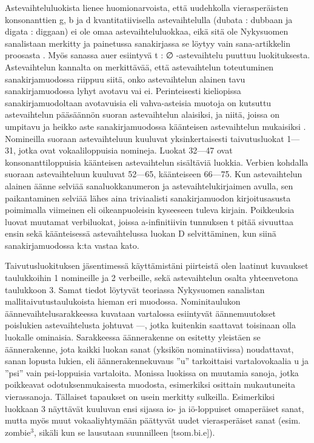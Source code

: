 \documentclass[free]{flammie}
\begin{document}
Astevaihteluluokista lienee huomionarvoista, että uudehkolla vierasperäisten konsonanttien g, b ja d kvantitatiivisella astevaihtelulla (dubata : dubbaan ja digata :
diggaan) ei ole omaa astevaihteluluokkaa, eikä sitä ole Nykysuomen sanalistaan
merkitty ja painetussa sanakirjassa se löytyy vain sana-artikkelin proosasta \cite{eronen1994nykysuomen}. Myös sanassa auer esiintyvä t : ∅ -astevaihtelu puuttuu luokituksesta.
Astevaihtelun kannalta on merkittävää, että astevaihtelun toteutuminen sanakirjamuodossa riippuu siitä, onko astevaihtelun alainen tavu sanakirjamuodossa lyhyt avotavu vai ei. Perinteisesti kieliopissa sanakirjamuodoltaan avotavuisia eli
vahva-asteisia muotoja on kutsuttu astevaihtelun pääsäännön suoran astevaihtelun
alaisiksi, ja niitä, joissa on umpitavu ja heikko aste sanakirjamuodossa käänteisen
astevaihtelun mukaisiksi \cite{hakulinen2008iso}. Nomineilla suoraan astevaihteluun kuuluvat yksinkertaisesti taivutusluokat 1—31, jotka ovat vokaaliloppuisia
nomineja. Luokat 32—47 ovat konsonanttiloppuisia käänteisen astevaihtelun sisältäviä luokkia. Verbien kohdalla suoraan astevaihteluun kuuluvat 52—65, käänteiseen 66—75. Kun astevaihtelun alainen äänne selviää sanaluokkanumeron ja
astevaihtelukirjaimen avulla, sen paikantaminen selviää lähes aina triviaalisti sanakirjamuodon kirjoitusasusta poimimalla viimeinen eli oikeanpuoleisin kyseeseen tuleva kirjain. Poikkeuksia luovat muutamat verbiluokat, joissa a-infinitiivin
tunnuksen t pitää sivuuttaa ensin sekä käänteisessä astevaihtelussa luokan D selvittäminen, kun siinä sanakirjamuodossa k:ta vastaa kato.

Taivutusluokituksen jäsentimessä käyttämistäni piirteistä olen laatinut kuvaukset
taulukkoihin 1 nomineille ja 2 verbeille, sekä astevaihtelun osalta yhteenvetona
taulukkoon 3. Samat tiedot löytyvät teoriassa Nykysuomen sanalistan \cite{nykysuomensanalista2006} mallitaivutustaulukoista hieman eri muodossa.
Nominitaulukon äännevaihtelusarakkeessa kuvataan vartalossa esiintyvät äännemuutokset poislukien astevaihtelusta johtuvat —, jotka kuitenkin saattavat toisinaan olla luokalle ominaisia. Sarakkeessa äännerakenne on esitetty yleistäen se
äännerakenne, jota kaikki luokan sanat (yksikön nominatiivissa) noudattavat, sanan lopusta lukien, eli äännerakennekuvaus ”u” tarkoittaisi vartalovokaalia u ja
”psi” vain psi-loppuisia vartaloita. Monissa luokissa on muutamia sanoja, jotka poikkeavat odotuksenmukaisesta muodosta, esimerkiksi osittain mukautuneita
vierassanoja. Tällaiset tapaukset on usein merkitty sulkeilla. Esimerkiksi luokkaan 3 näyttävät kuuluvan ensi sijassa io- ja iö-loppuiset omaperäiset sanat, mutta
myös muut vokaaliyhtymään päättyvät uudet vierasperäiset sanat (esim. zombie$^3$,
sikäli kun se lausutaan suunnilleen [tsom.bi.e]).
\end{document}
